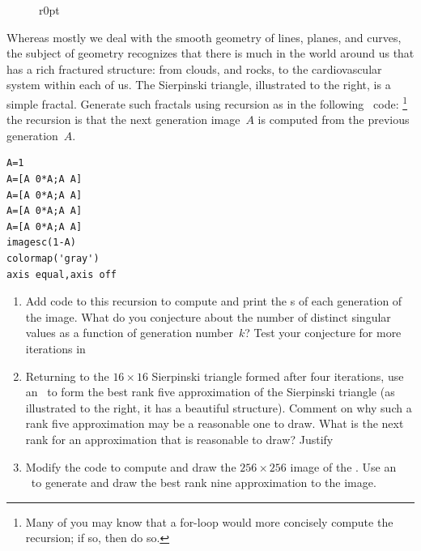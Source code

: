 \begin{exercise} \label{ex:siertri} 
\begin{figure}r{0pt}

\end{figure}
Whereas mostly we deal with the smooth geometry of lines, planes, and curves, 
the subject of  geometry recognizes that there is much in the world around us that has a rich fractured structure: from clouds, and rocks, to the cardiovascular system within each of us.
The Sierpinski triangle, illustrated to the right, is a simple fractal.
Generate such fractals using recursion as in the following \script\ code:%
\footnote{Many of you may know that a for-loop would more concisely compute the recursion; if so, then do so.}
the recursion is that the next generation image~\(A\) is computed from the previous generation~\(A\).
\begin{verbatim}
A=1
A=[A 0*A;A A]
A=[A 0*A;A A]
A=[A 0*A;A A]
A=[A 0*A;A A]
imagesc(1-A)
colormap('gray')
axis equal,axis off
\end{verbatim}
%
\setbox\ajrqrbox\hbox{}%
\marginajrbox%

\begin{enumerate}
\item Add code to this recursion to compute and print the s of each generation of the  image.
What do you conjecture about the number of distinct singular values as a function of generation number~\(k\)?
Test your conjecture for more iterations in 

\item 
\begin{figbox}{}%
Returning to the \(16\times16\) Sierpinski triangle formed after four iterations, use an \svd\ to form the best rank five approximation of the Sierpinski triangle (as illustrated to the right, it has a beautiful structure).  
Comment on why such a rank five approximation may be a reasonable one to draw.  
What is the next rank for an approximation that is reasonable to draw?  Justify 
\end{figbox}

\item Modify the code to compute and draw the \(256\times256\) image of the .
Use an \svd\ to generate and draw the best rank nine approximation to the image.
\end{enumerate}
\end{exercise}


